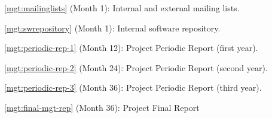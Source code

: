 \begin{Workpackage}{\thewpno}
\begin{WPDeliverables}
\begin{compactitem}
\item
\ref{mgt:mailinglists}
(Month 1): 
Internal and external mailing lists.
\item
\ref{mgt:swrepository}
(Month 1): 
Internal software repository.
\item
\ref{mgt:periodic-rep-1}
(Month 12): 
Project Periodic Report (first year).
\item
\ref{mgt:periodic-rep-2}
 (Month 24): 
Project Periodic Report (second year).
\item
\ref{mgt:periodic-rep-3}
(Month 36): 
Project Periodic Report (third year).
\item
\ref{mgt:final-mgt-rep}
(Month 36): 
Project Final Report
\end{compactitem}
\end{WPDeliverables}
\end{Workpackage}
